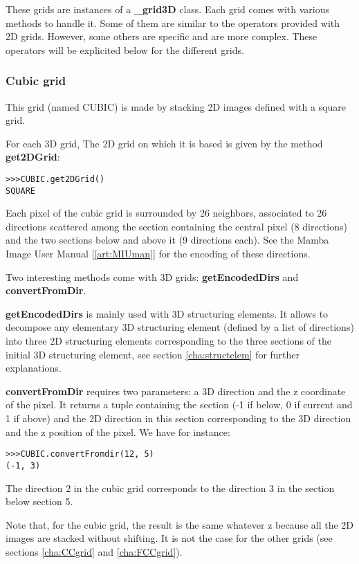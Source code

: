 \documentclass[a4paper,10pt,oneside]{article}
\begin{document}
These grids are instances of a \textbf{_grid3D} class. Each grid comes with various methods to handle it. Some of them are similar to
the operators provided with 2D grids. However, some others are specific and are more complex. These operators will be explicited
below for the different grids.

\subsubsection{Cubic grid}
This grid (named CUBIC) is made by stacking 2D images defined with a square grid.

For each 3D grid, The 2D grid on which it is based is given by the method \textbf{get2DGrid}:

\lstset{language=Python}
\begin{lstlisting}
>>>CUBIC.get2DGrid()
SQUARE
\end{lstlisting}

Each pixel of the cubic grid is surrounded by 26 neighbors, associated to 26 directions scattered among the section containing the
central pixel (8 directions) and the two sections below and above it (9 directions each). See the Mamba Image User Manual [\ref{art:MIUman}]
for the encoding of these directions.

Two interesting methods come with 3D grids: \textbf{getEncodedDirs} and \textbf{convertFromDir}.

\textbf{getEncodedDirs} is mainly used with 3D structuring elements. It allows to decompose any elementary 3D structuring element (defined
by a list of directions) into three 2D structuring elements corresponding to the three sections of the initial 3D structuring
element, see section \ref{cha:structelem} for further explanations.

\textbf{convertFromDir} requires two parameters: a 3D direction and the z coordinate of the pixel. It returns a tuple containing the section
(-1 if below, 0 if current and 1 if above) and the 2D direction in this section corresponding to the 3D direction and the z position of the
pixel. We have for instance:

\lstset{language=Python}
\begin{lstlisting}
>>>CUBIC.convertFromdir(12, 5)
(-1, 3)
\end{lstlisting}

The direction 2 in the cubic grid corresponds to the direction 3 in the section below section 5.

Note that, for the cubic grid, the result is the same whatever z because all the 2D images are stacked without shifting. It is
not the case for the other grids (see sections \ref{cha:CCgrid} and \ref{cha:FCCgrid}).
\end{document}
